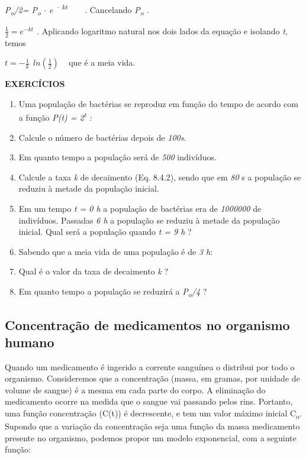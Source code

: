 \textit{ P\textsubscript{o}/2= P\textsubscript{o} $ \cdot $  e \textsuperscript{– kt}}{ \textit{~ ~ . }Cancelando\textit{ P\textsubscript{o} .}}

\( \frac{1}{2}=e^{-kt} \) { \textit{. }Aplicando logaritmo natural nos dois lados da equação e isolando \textit{t}, temos\textit{ }}

{ \textit{ }}

\( t=-\frac{1}{k}~~ ln  \left( \frac{ 1}{2} \right)  \) { ~ que é a meia vida.}

\noindent\textbf{EXERCÍCIOS \thesubsection}
\begin{enumerate}[label=\thesubsection.\arabic*]
    \item Uma população de bactérias se reproduz em função do tempo de acordo com a função  \textit{P(t) = 2\textsuperscript{t} :}

	\item Calcule o número de bactérias depois de \textit{100s}. 

	\item Em quanto tempo a população será de \textit{500} indivíduos.

	\item Calcule a taxa \textit{k} de decaimento (Eq. 8.4.2), sendo que em \textit{80} s a população se reduziu à metade da população inicial.

	\item Em um tempo \textit{t = 0 h} a população de bactérias era de \textit{1000000} de indivíduos. Passadas \textit{6 h} a população se reduziu à metade da população inicial. Qual será a população quando \textit{t = 9 h} ?

	\item Sabendo que a meia vida de uma população é de \textit{3 h}:

	\item Qual é o valor da taxa de decaimento \textit{k} ?

	\item Em quanto tempo a população se reduzirá a \textit{P\textsubscript{o}/4} ?
\end{enumerate}

\subsection{Concentração de medicamentos no organismo humano}

Quando um medicamento é ingerido a corrente sanguínea o distribui por todo o organismo. Consideremos que a concentração (massa, em gramas, por unidade de volume de sangue) é a mesma em cada parte do corpo. A eliminação do medicamento ocorre na medida que o sangue vai passando pelos rins. Portanto, uma função concentração (C(t)) é decrescente, e tem um valor máximo inicial C\textsubscript{o}. Supondo que a variação da concentração seja uma função da massa medicamento presente no organismo, podemos propor um modelo exponencial, com a seguinte função:

